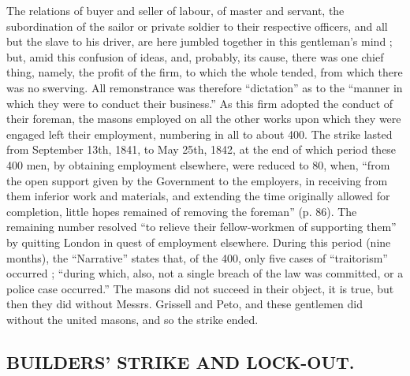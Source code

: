 The relations of buyer and seller of labour, of master and servant, the
subordination of the sailor or private soldier to their respective
officers, and all but the slave to his driver, are here jumbled together
in this gentleman's mind ; but, amid this confusion of ideas, and,
probably, its cause, there was one chief thing, namely, the profit of
the firm, to which the whole tended, from which there was no swerving.
All remonstrance was therefore ``dictation'' as to the ``manner in which
they were to conduct their business.'' As this firm adopted the conduct
of their foreman, the masons employed on all the other works upon which
they were engaged left their employment, numbering in all to about 400.
The strike lasted from September 13th, 1841, to May 25th, 1842, at the
end of which period these 400 men, by obtaining employment elsewhere,
were reduced to 80, when, ``from the open support given by the
Government to the employers, in receiving from them inferior work and
materials, and extending the time originally allowed for completion,
little hopes remained of removing the foreman'' (p. 86). The remaining
number resolved ``to relieve their fellow-workmen of supporting them''
by quitting London in quest of employment elsewhere. During this period
(nine months), the ``Narrative'' states that, of the 400, only five
cases of ``traitorism'' occurred ; ``during which, also, not a single
breach of the law was committed, or a police case occurred.'' The masons
did not succeed in their object, it is true, but then they did without
Messrs. Grissell and Peto, and these gentlemen did without the united
masons, and so the strike ended.

\subsection{BUILDERS' STRIKE AND LOCK-OUT.}

